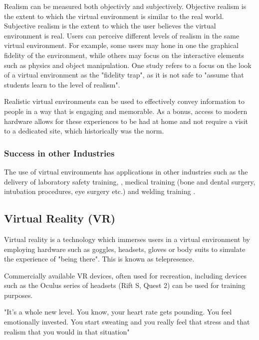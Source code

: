 \documentclass[12pt]{article}
\begin{document}
Realism can be measured both objectivly and subjectively. \cite{gonccalves2022systematic} Objective realism is the extent to which the virtual environment is similar to the real world. Subjective realism is the extent to which the user believes the virtual environment is real. Users can perceive different levels of realism in the same virtual environment. For example, some users may hone in one the graphical fidelity of the environment, while others may focus on the interactive elements such as physics and object manipulation. One study refers to a focus on the look of a virtual environment as the "fidelity trap", as it is not safe to "assume that students learn to the level of realism". \cite{carey2020high}

Realistic virtual environments can be used to effectively convey information to people in a way that is engaging and memorable. As a bonus, access to modern hardware allows for these experiences to be had at home \cite{anderson2024blending} and not require a visit to a dedicated site, which historically was the norm. \cite{Scott2022}

\subsubsection{Success in other Industries}

The use of virtual environments has applications in other industries such as the delivery of laboratory safety training, \cite{makransky2019motivational}, medical training (bone and dental surgery, intubation procedures, eye surgery etc.) \cite{ruthenbeck2015virtual} and welding training \cite{da2010use}. 

\subsection{Virtual Reality (VR)}

Virtual reality is a technology which immerses users in a virtual environment by employing hardware such as goggles, headsets, gloves or body suits to simulate the experience of "being there". This is known as telepresence. \cite{britannicaVR}

Commercially available VR devices, often used for recreation, including devices such as the Oculus series of headsets (Rift S, Quest 2) \cite{greenwald2020} can be used for training purposes. \cite{kaplan2021effects}\cite{axonVRTraining}\cite{axonVRTrainingUK}

"It's a whole new level. You know, your heart rate gets pounding. You feel emotionally invested. You start sweating and you really feel that stress and that realism that you would in that situation"
\end{document}
